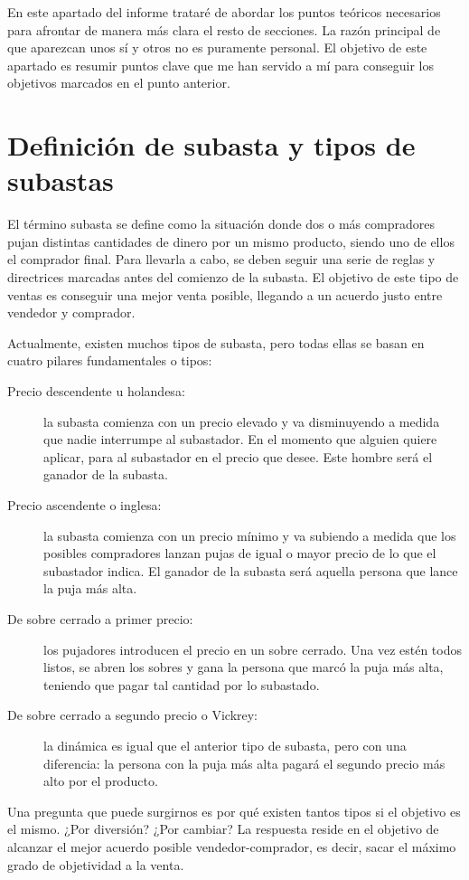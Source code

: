 	En este apartado del informe trataré de abordar los puntos teóricos necesarios para afrontar de manera más clara el resto de secciones. La razón principal de que aparezcan unos sí y otros no es puramente personal. El objetivo de este apartado es resumir puntos clave que me han servido a mí para conseguir los objetivos marcados en el punto anterior.
	
\section{Definición de subasta y tipos de subastas}

	El término subasta se define como la situación donde dos o más compradores pujan distintas cantidades de dinero por un mismo producto, siendo uno de ellos el comprador final. Para llevarla a cabo, se deben seguir una serie de reglas y directrices marcadas antes del comienzo de la subasta. El objetivo de este tipo de ventas es conseguir una mejor venta posible, llegando a un acuerdo justo entre vendedor y comprador.
	
	Actualmente, existen muchos tipos de subasta, pero todas ellas se basan en cuatro pilares fundamentales o tipos:
	
	\begin{description}
		\item[Precio descendente u holandesa:] la subasta comienza con un precio elevado y va disminuyendo a medida que nadie interrumpe al subastador. En el momento que alguien quiere aplicar, para al subastador en el precio que desee. Este hombre será el ganador de la subasta.
		\item[Precio ascendente o inglesa:] la subasta comienza con un precio mínimo y va subiendo a medida que los posibles compradores lanzan pujas de igual o mayor precio de lo que el subastador indica. El ganador de la subasta será aquella persona que lance la puja más alta.
		\item[De sobre cerrado a primer precio:] los pujadores introducen el precio en un sobre cerrado. Una vez estén todos listos, se abren los sobres y gana la persona que marcó la puja más alta, teniendo que pagar tal cantidad por lo subastado.
		\item[De sobre cerrado a segundo precio o Vickrey:] la dinámica es igual que el anterior tipo de subasta, pero con una diferencia: la persona con la puja más alta pagará el segundo precio más alto por el producto.
	\end{description}
	
	Una pregunta que puede surgirnos es por qué existen tantos tipos si el objetivo es el mismo. ¿Por diversión? ¿Por cambiar? La respuesta reside en el objetivo de alcanzar el mejor acuerdo posible vendedor-comprador, es decir, sacar el máximo grado de objetividad a la venta. 
	
